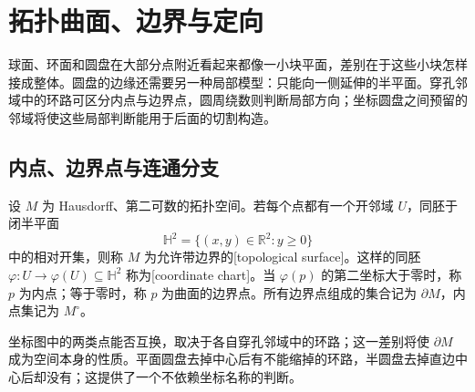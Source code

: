 
% 
% 

\section{拓扑曲面、边界与定向}
\label{g1:sec:0601}

球面、环面和圆盘在大部分点附近看起来都像一小块平面，差别在于这些小块怎样接成整体。圆盘的边缘还需要另一种局部模型：只能向一侧延伸的半平面。穿孔邻域中的环路可区分内点与边界点，圆周绕数则判断局部方向；坐标圆盘之间预留的邻域将使这些局部判断能用于后面的切割构造。

\subsection{内点、边界点与连通分支}
\label{g1:subsec:0601:01}

\begin{definition}[拓扑曲面]\label{g1:def:topological-surface}
	设 \(M\) 为 Hausdorff、第二可数的拓扑空间。若每个点都有一个开邻域 \(U\)，同胚于闭半平面
	\[
		\mathbb H^2=\{(x,y)\in\mathbb R^2:y\ge0\}
	\]
	中的相对开集，则称 \(M\) 为允许带边界的[topological surface]。这样的同胚 \(\varphi:U\to\varphi(U)\subseteq\mathbb H^2\) 称为[coordinate chart]。当 \(\varphi(p)\) 的第二坐标大于零时，称 \(p\) 为内点；等于零时，称 \(p\) 为曲面的边界点。所有边界点组成的集合记为 \(\partial M\)，内点集记为 \(M^\circ\)。
\end{definition}

坐标图中的两类点能否互换，取决于各自穿孔邻域中的环路；这一差别将使 \(\partial M\) 成为空间本身的性质。平面圆盘去掉中心后有不能缩掉的环路，半圆盘去掉直边中心后却没有；这提供了一个不依赖坐标名称的判断。

